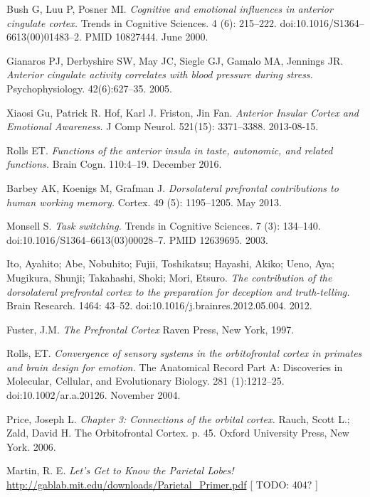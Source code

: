 \documentclass[twocolumn]{article}
\begin{document}
\begin{thebibliography}{9}
  Bush G, Luu P, Posner MI.
  \textit{Cognitive and emotional influences in anterior cingulate cortex.}
  Trends in Cognitive Sciences. 4 (6):
  215–222. doi:10.1016/S1364–6613(00)01483–2. PMID 10827444. June 2000.

  Gianaros PJ, Derbyshire SW, May JC, Siegle GJ, Gamalo MA, Jennings JR.
  \textit{Anterior cingulate activity correlates with blood pressure during
    stress.}
  Psychophysiology. 42(6):627–35. 2005.

  Xiaosi Gu, Patrick R. Hof, Karl J. Friston, Jin Fan.
  \textit{Anterior Insular Cortex and Emotional Awareness.}
  J Comp Neurol. 521(15): 3371–3388. 2013-08-15.

  Rolls ET.
  \textit{Functions of the anterior insula in taste, autonomic, and related
    functions.}
  Brain Cogn. 110:4–19. December 2016.

  Barbey AK, Koenigs M, Grafman J.
  \textit{Dorsolateral prefrontal contributions to human working memory.}
  Cortex. 49 (5): 1195–1205. May 2013.

  Monsell S.
  \textit{Task switching.}
  Trends in Cognitive Sciences. 7 (3):
  134–140. doi:10.1016/S1364–6613(03)00028–7. PMID 12639695. 2003.

  Ito, Ayahito; Abe, Nobuhito; Fujii, Toshikatsu; Hayashi, Akiko; Ueno, Aya;
  Mugikura, Shunji; Takahashi, Shoki; Mori, Etsuro.
  \textit{The contribution of the dorsolateral prefrontal cortex to the preparation
    for deception and truth-telling.}
  Brain Research. 1464: 43–52. doi:10.1016/j.brainres.2012.05.004. 2012.

  Fuster, J.M.
  \textit{The Prefrontal Cortex}
  Raven Press, New York, 1997.

  Rolls, ET.
  \textit{Convergence of sensory systems in the orbitofrontal
    cortex in primates and brain design for emotion.}
  The Anatomical Record Part A: Discoveries in Molecular, Cellular, and Evolutionary
  Biology. 281 (1):1212–25. doi:10.1002/ar.a.20126. November 2004.

  Price, Joseph L.
  \textit{Chapter 3: Connections of the orbital cortex.}
  Rauch, Scott L.; Zald, David H.
  The Orbitofrontal Cortex. p. 45.
  Oxford University Press, New York. 2006.

  Martin, R. E.
  \textit{Let’s Get to Know the Parietal Lobes!}
  \url{http://gablab.mit.edu/downloads/Parietal_Primer.pdf} [ TODO: 404? ]

\end{thebibliography}
\end{document}

